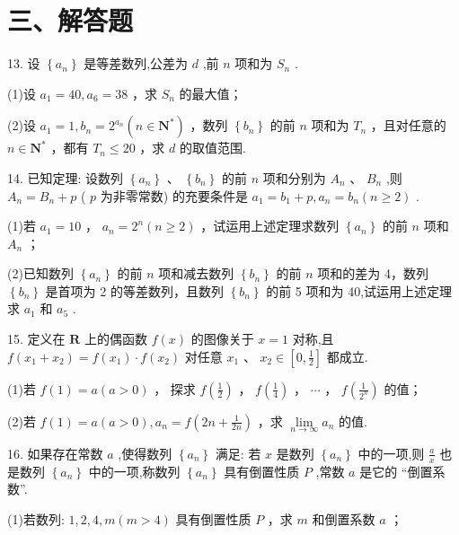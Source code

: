 \section*{三、解答题}

13. 设 $\left\{  {a}_{n}\right\}$ 是等差数列,公差为 $d$ ,前 $n$ 项和为 ${S}_{n}$ .

(1)设 ${a}_{1} = {40},{a}_{6} = {38}$ ，求 ${S}_{n}$ 的最大值；

(2)设 ${a}_{1} = 1,{b}_{n} = {2}^{{a}_{n}}\left( {n \in  {\mathbf{N}}^{ * }}\right)$ ，数列 $\left\{  {b}_{n}\right\}$ 的前 $n$ 项和为 ${T}_{n}$ ，且对任意的 $n \in  {\mathbf{N}}^{ * }$ ，都有 ${T}_{n} \leq  {20}$ ，求 $d$ 的取值范围.

14. 已知定理: 设数列 $\left\{  {a}_{n}\right\}$ 、 $\left\{  {b}_{n}\right\}$ 的前 $n$ 项和分别为 ${A}_{n}$ 、 ${B}_{n}$ ,则 ${A}_{n} = {B}_{n} + p$ ( $p$ 为非零常数) 的充要条件是 ${a}_{1} = {b}_{1} + p,{a}_{n} = {b}_{n}\left( {n \geq  2}\right)$ .

(1)若 ${a}_{1} = {10}$ ， ${a}_{n} = {2}^{n}\left( {n \geq  2}\right)$ ，试运用上述定理求数列 $\left\{  {a}_{n}\right\}$ 的前 $n$ 项和 ${A}_{n}$ ；

(2)已知数列 $\left\{  {a}_{n}\right\}$ 的前 $n$ 项和减去数列 $\left\{  {b}_{n}\right\}$ 的前 $n$ 项和的差为 4，数列 $\left\{  {b}_{n}\right\}$ 是首项为 2 的等差数列，且数列 $\left\{  {b}_{n}\right\}$ 的前 5 项和为 40,试运用上述定理求 ${a}_{1}$ 和 ${a}_{5}$ .

15. 定义在 $\mathbf{R}$ 上的偶函数 $f\left( x\right)$ 的图像关于 $x = 1$ 对称,且 $f\left( {{x}_{1} + {x}_{2}}\right)  = f\left( {x}_{1}\right)  \cdot  f\left( {x}_{2}\right)$ 对任意 ${x}_{1}\text{ 、 }{x}_{2} \in  \left\lbrack  {0,\frac{1}{2}}\right\rbrack$ 都成立.

(1)若 $f\left( 1\right)  = a\left( {a > 0}\right)$ ， 探求 $f\left( \frac{1}{2}\right)$ ， $f\left( \frac{1}{4}\right)$ ， $\cdots$ ， $f\left( \frac{1}{{2}^{n}}\right)$ 的值；

(2)若 $f\left( 1\right)  = a\left( {a > 0}\right) ,{a}_{n} = f\left( {{2n} + \frac{1}{2n}}\right)$ ，求 $\mathop{\lim }\limits_{{n \rightarrow  \infty }}{a}_{n}$ 的值.

16. 如果存在常数 $a$ ,使得数列 $\left\{  {a}_{n}\right\}$ 满足: 若 $x$ 是数列 $\left\{  {a}_{n}\right\}$ 中的一项,则 $\frac{a}{x}$ 也是数列 $\left\{  {a}_{n}\right\}$ 中的一项,称数列 $\left\{  {a}_{n}\right\}$ 具有倒置性质 $P$ ,常数 $a$ 是它的 “倒置系数”.

(1)若数列: $1,2,4,m\left( {m > 4}\right)$ 具有倒置性质 $P$ ，求 $m$ 和倒置系数 $a$ ；


